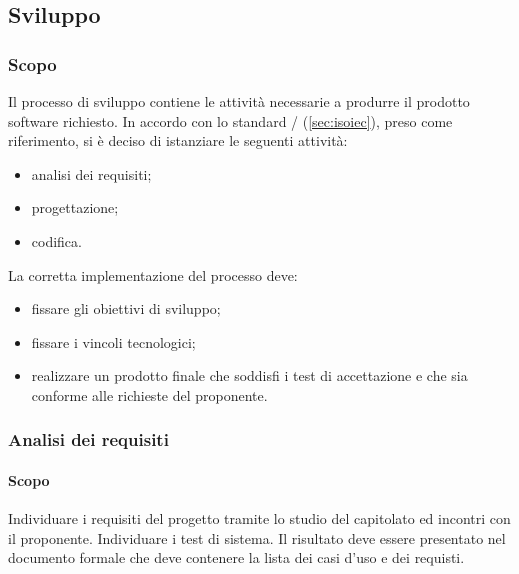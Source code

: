     \subsection{Sviluppo}
        \subsubsection{Scopo}
	        Il processo di sviluppo contiene le attività necessarie a produrre il prodotto software richiesto. In accordo con lo standard / (\ref{sec:isoiec}), preso come riferimento, si è deciso di istanziare le seguenti attività:
        \begin{itemize}
            \item analisi dei requisiti;
            \item progettazione;
            \item codifica.
        \end{itemize}
        La corretta implementazione del processo deve:
        \begin{itemize}
            \item fissare gli obiettivi di sviluppo;
            \item fissare i vincoli tecnologici;
            \item realizzare un prodotto finale che soddisfi i test di accettazione e che sia conforme alle richieste del proponente.
        \end{itemize}
        \subsubsection{Analisi dei requisiti}
            \paragraph{Scopo}
            Individuare i requisiti del progetto tramite lo studio del capitolato ed incontri con il proponente. Individuare i test di sistema. Il risultato deve essere presentato nel documento formale \adr{} che deve contenere la lista dei casi d'uso e dei requisti.

